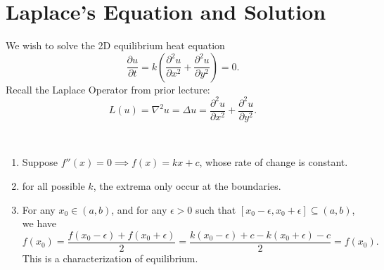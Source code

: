 \documentclass[class=article,crop=false]{standalone}
\begin{document}
\newpage
\section{Laplace's Equation and Solution}
We wish to solve the 2D equilibrium heat equation
\[
	\frac{\partial u}{\partial t} = k\left( \frac{\partial^2 u}{\partial { x}^2} + \frac{\partial^2 u}{\partial { y}^2}  \right) = 0
.\] 
Recall the Laplace Operator from prior lecture:
\[
	L(u) = \nabla^2 u = \Delta u  = \frac{\partial^2 u}{\partial { x}^2} + \frac{\partial^2 u}{\partial { y}^2} 
.\] 

\begin{eg}
~\begin{enumerate}[label=\arabic*)]
	\item Suppose $ f''(x)=0 \implies f(x)=kx+c$, whose rate of change is constant.
	\item for all possible $ k$, the extrema only occur at the boundaries.
	\item For any  $ x_0 \in (a,b)$, and for any $ \epsilon>0$ such that $ [x_0- \epsilon,x_0+ \epsilon] \subseteq (a,b)$, we have
		\[
			f(x_0) = \frac{f(x_0- \epsilon) + f(x_0+ \epsilon)}{ 2} = \frac{k(x_0 - \epsilon)+c-k(x_0 + \epsilon) -c}{2 }= f(x_0)
		.\]
		This is a characterization of equilibrium.
\end{enumerate}
\end{eg}
\end{document}
